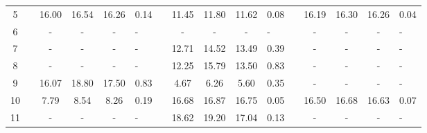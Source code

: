 \begin{table}
\begin{tabular}{ccccc>{\centering}p{0.75cm}cccc>{\centering}p{0.75cm}cccc>{\centering}p{0.75cm}}
\cline{1-6} \cline{8-11} \cline{13-16} 
{\scriptsize{5}} &  & {\scriptsize{16.00}} & {\scriptsize{16.54}} & {\scriptsize{16.26}} & {\scriptsize{0.14}} &  & {\scriptsize{11.45}} & {\scriptsize{11.80}} & {\scriptsize{11.62}} & {\scriptsize{0.08}} &  & {\scriptsize{16.19}} & {\scriptsize{16.30}} & {\scriptsize{16.26}} & {\scriptsize{0.04}}\tabularnewline
\cline{1-6} \cline{8-11} \cline{13-16} 
{\scriptsize{6}} &  & {\scriptsize{-}} & {\scriptsize{-}} & {\scriptsize{-}} & {\scriptsize{-}} &  & {\scriptsize{-}} & {\scriptsize{-}} & {\scriptsize{-}} & {\scriptsize{-}} &  & {\scriptsize{-}} & {\scriptsize{-}} & {\scriptsize{-}} & {\scriptsize{-}}\tabularnewline
\cline{1-6} \cline{8-11} \cline{13-16} 
{\scriptsize{7}} &  & {\scriptsize{-}} & {\scriptsize{-}} & {\scriptsize{-}} & {\scriptsize{-}} &  & {\scriptsize{12.71}} & {\scriptsize{14.52}} & {\scriptsize{13.49}} & {\scriptsize{0.39}} &  & {\scriptsize{-}} & {\scriptsize{-}} & {\scriptsize{-}} & {\scriptsize{-}}\tabularnewline
\cline{1-6} \cline{8-11} \cline{13-16} 
{\scriptsize{8}} &  & {\scriptsize{-}} & {\scriptsize{-}} & {\scriptsize{-}} & {\scriptsize{-}} &  & {\scriptsize{12.25}} & {\scriptsize{15.79}} & {\scriptsize{13.50}} & {\scriptsize{0.83}} &  & {\scriptsize{-}} & {\scriptsize{-}} & {\scriptsize{-}} & {\scriptsize{-}}\tabularnewline
\cline{1-6} \cline{8-11} \cline{13-16} 
{\scriptsize{9}} &  & {\scriptsize{16.07}} & {\scriptsize{18.80}} & {\scriptsize{17.50}} & {\scriptsize{0.83}} &  & {\scriptsize{4.67}} & {\scriptsize{6.26}} & {\scriptsize{5.60}} & {\scriptsize{0.35}} &  & {\scriptsize{-}} & {\scriptsize{-}} & {\scriptsize{-}} & {\scriptsize{-}}\tabularnewline
\cline{1-6} \cline{8-11} \cline{13-16} 
{\scriptsize{10}} &  & {\scriptsize{7.79}} & {\scriptsize{8.54}} & {\scriptsize{8.26}} & {\scriptsize{0.19}} &  & {\scriptsize{16.68}} & {\scriptsize{16.87}} & {\scriptsize{16.75}} & {\scriptsize{0.05}} &  & {\scriptsize{16.50}} & {\scriptsize{16.68}} & {\scriptsize{16.63}} & {\scriptsize{0.07}}\tabularnewline
\cline{1-6} \cline{8-11} \cline{13-16} 
{\scriptsize{11}} &  & {\scriptsize{-}} & {\scriptsize{-}} & {\scriptsize{-}} & {\scriptsize{-}} &  & {\scriptsize{18.62}} & {\scriptsize{19.20}} & {\scriptsize{17.04}} & {\scriptsize{0.13}} &  & {\scriptsize{-}} & {\scriptsize{-}} & {\scriptsize{-}} & {\scriptsize{-}}\tabularnewline
\hline 
\end{tabular}
\end{table}


